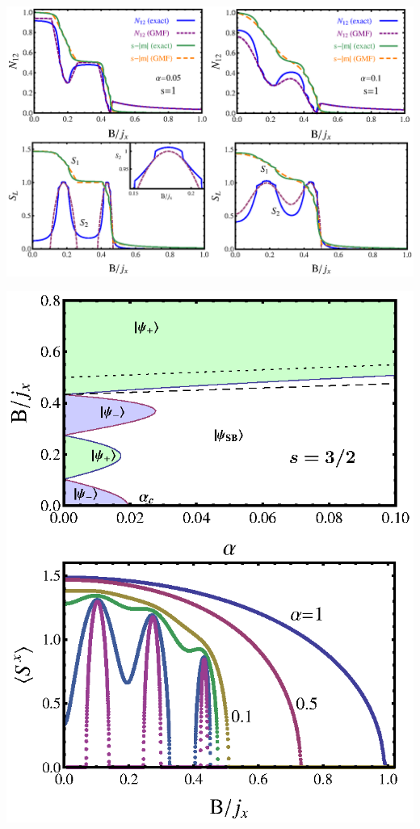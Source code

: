 \documentclass[a0paper,portrait]{baposter}
\begin{document}
\begin{poster}
{\hspace*{5.8cm}\includegraphics*[scale=.4]{fig3}
\vspace*{-6.35cm}

\hspace*{-1.8cm}
\includegraphics*[scale=.45]{fig5}\hspace*{-3cm}
\vspace{-13.45cm}

}
\end{poster}
\end{document}
